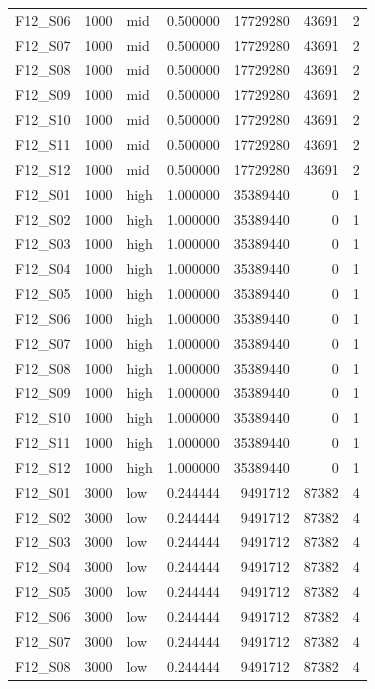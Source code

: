 \begin{longtable}{lllr r r r}
F12\_S06 & 1000 & mid & 0.500000 & 17729280 & 43691 & 2 \\
F12\_S07 & 1000 & mid & 0.500000 & 17729280 & 43691 & 2 \\
F12\_S08 & 1000 & mid & 0.500000 & 17729280 & 43691 & 2 \\
F12\_S09 & 1000 & mid & 0.500000 & 17729280 & 43691 & 2 \\
F12\_S10 & 1000 & mid & 0.500000 & 17729280 & 43691 & 2 \\
F12\_S11 & 1000 & mid & 0.500000 & 17729280 & 43691 & 2 \\
F12\_S12 & 1000 & mid & 0.500000 & 17729280 & 43691 & 2 \\
F12\_S01 & 1000 & high & 1.000000 & 35389440 & 0 & 1 \\
F12\_S02 & 1000 & high & 1.000000 & 35389440 & 0 & 1 \\
F12\_S03 & 1000 & high & 1.000000 & 35389440 & 0 & 1 \\
F12\_S04 & 1000 & high & 1.000000 & 35389440 & 0 & 1 \\
F12\_S05 & 1000 & high & 1.000000 & 35389440 & 0 & 1 \\
F12\_S06 & 1000 & high & 1.000000 & 35389440 & 0 & 1 \\
F12\_S07 & 1000 & high & 1.000000 & 35389440 & 0 & 1 \\
F12\_S08 & 1000 & high & 1.000000 & 35389440 & 0 & 1 \\
F12\_S09 & 1000 & high & 1.000000 & 35389440 & 0 & 1 \\
F12\_S10 & 1000 & high & 1.000000 & 35389440 & 0 & 1 \\
F12\_S11 & 1000 & high & 1.000000 & 35389440 & 0 & 1 \\
F12\_S12 & 1000 & high & 1.000000 & 35389440 & 0 & 1 \\
F12\_S01 & 3000 & low & 0.244444 & 9491712 & 87382 & 4 \\
F12\_S02 & 3000 & low & 0.244444 & 9491712 & 87382 & 4 \\
F12\_S03 & 3000 & low & 0.244444 & 9491712 & 87382 & 4 \\
F12\_S04 & 3000 & low & 0.244444 & 9491712 & 87382 & 4 \\
F12\_S05 & 3000 & low & 0.244444 & 9491712 & 87382 & 4 \\
F12\_S06 & 3000 & low & 0.244444 & 9491712 & 87382 & 4 \\
F12\_S07 & 3000 & low & 0.244444 & 9491712 & 87382 & 4 \\
F12\_S08 & 3000 & low & 0.244444 & 9491712 & 87382 & 4 \\

\end{longtable}
